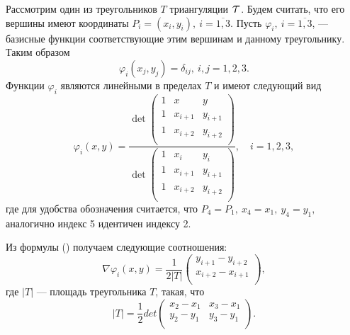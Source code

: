 \documentclass[12pt, a4paper]{article}
\renewcommand{\phi}{\varphi}
\newcommand\Tau{\scalerel*{\tau}{T}}
\begin{document}
				
				Рассмотрим один из треугольников $T$ триангуляции $\Tau$. Будем считать, что его вершины имеют координаты  $P_i = (x_i, y_i), \ i=\overline{1,3}$. Пусть $\phi_i, \ i=\overline{1,3}$, --- базисные функции соответствующие этим вершинам и данному треугольнику. Таким образом 
				\begin{equation*}
					\phi_i(x_j, y_j) = \delta_{ij}, \ i,j = 1,2,3.
				\end{equation*}
				Функции $\phi_i$ являются линейными в пределах $T$ и имеют следующий вид
				\begin{equation}
					\phi_i(x,y) = 
					\dfrac{
						\det{
							\begin{pmatrix}
								1 & x & y \\
								1 & x_{i+1} & y_{i+1} \\
								1 & x_{i+2} & y_{i+2} \\							
							 \end{pmatrix}
						 }
					}{
					\det{
						\begin{pmatrix}
							1 & x_{i} & y_{i} \\
							1 & x_{i+1} & y_{i+1} \\
							1 & x_{i+2} & y_{i+2} \\							
						\end{pmatrix}
						}
					}, \quad i = 1,2,3,
					\label{basis_fun_phi}
				\end{equation}
				где для удобства обозначения считается, что $P_4 = P_1, \ x_4 = x_1, \ y_4 = y_1, $ аналогично индекс 5 идентичен индексу 2.
				
				Из формулы () получаем следующие соотношения:
				\begin{equation*}
					\nabla \phi_{i}(x,y) = \dfrac{1}{2 |T|} 
					\begin{pmatrix}
						y_{i+1} - y_{i+2} \\
						x_{i+2} - x_{i+1} \\
					\end{pmatrix},
				\end{equation*}
				где $|T|$ --- площадь треугольника $T$, такая, что
				\begin{equation*}
					|T| = \dfrac{1}{2} 
					det{
						\begin{pmatrix}
							x_2 - x_1 & x_3 - x_1 \\
							y_2 - y_1 & y_3 - y_1 \\
						\end{pmatrix}				
					}.
				\end{equation*}
				
\end{document}
